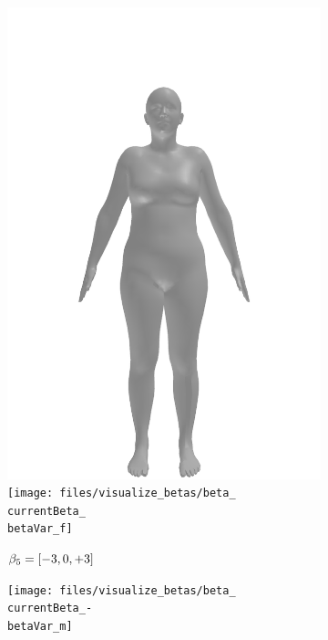 \begin{figure}[h!]
\begin{subfigure}{\betaWidth}
        \includegraphics[width=\imgWidth]{files/visualize_betas/baseline_f}
        \texttt{[image: files/visualize\_betas/beta\_\\currentBeta\_\\betaVar\_f]}
        \caption{$\beta_5 = [-3, 0, +3]$}
    \end{subfigure}
    \begin{subfigure}{\betaWidth}
        \def\currentBeta{5}
        \centering
        \texttt{[image: files/visualize\_betas/beta\_\\currentBeta\_-\\betaVar\_m]}

\end{subfigure}
\end{figure}
